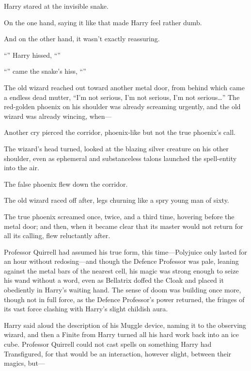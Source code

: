 Harry stared at the invisible snake.

On the one hand, saying it like that made Harry feel rather dumb.

And on the other hand, it wasn’t exactly reassuring.

“” Harry hissed, “”

“” came the snake’s hiss, “”

\later

The old wizard reached out toward another metal door, from behind which came a endless dead mutter, “I’m not serious, I’m not serious, I’m not serious…” The red-golden phoenix on his shoulder was already screaming urgently, and the old wizard was already wincing, when—

Another cry pierced the corridor, phoenix-like but not the true phoenix’s call.

The wizard’s head turned, looked at the blazing silver creature on his other shoulder, even as ephemeral and substanceless talons launched the spell-entity into the air.

The false phoenix flew down the corridor.

The old wizard raced off after, legs churning like a spry young man of sixty.

The true phoenix screamed once, twice, and a third time, hovering before the metal door; and then, when it became clear that its master would not return for all its calling, flew reluctantly after.

\later

Professor Quirrell had assumed his true form, this time—Polyjuice only lasted for an hour without redosing—and though the Defence Professor was pale, leaning against the metal bars of the nearest cell, his magic was strong enough to seize his wand without a word, even as Bellatrix doffed the Cloak and placed it obediently in Harry’s waiting hand. The sense of doom was building once more, though not in full force, as the Defence Professor’s power returned, the fringes of its vast force clashing with Harry’s slight childish aura.

Harry said aloud the description of his Muggle device, naming it to the observing wizard, and then a Finite from Harry turned all his hard work back into an ice cube. Professor Quirrell could not cast spells on something Harry had Transfigured, for that would be an interaction, however slight, between their magics, but—

